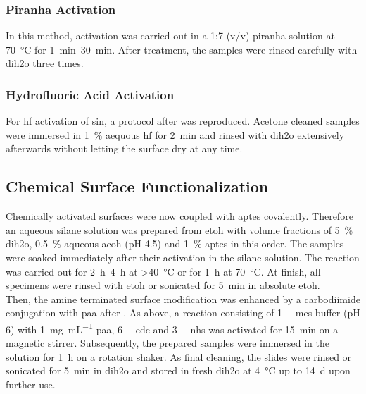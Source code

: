 \subsubsection{Piranha Activation}
In this method, activation was carried out in a 1:7 (v/v) piranha solution at \SI{70}{\degreeCelsius} for \SIrange{1}{30}{\minute}. After treatment, the samples were rinsed carefully with \gls{dih2o} three times.
\subsubsection{Hydrofluoric Acid Activation}
For \gls{hf} activation of \gls{sin}, a protocol after \citet{lit:chem:sin:surfacEtchingandMod} was reproduced. Acetone cleaned samples were immersed in \SI{1}{\percent} aequous \gls{hf} for \SI{2}{\minute} and rinsed with \gls{dih2o} extensively afterwards without letting the surface dry at any time.
\subsection{Chemical Surface Functionalization}
\label{sec:meth:surfFunc}
Chemically activated surfaces were now coupled with \gls{aptes} covalently. Therefore an aqueous silane solution was prepared from \gls{etoh} with volume fractions of \SI{5}{\percent} \gls{dih2o}, \SI{0.5}{\percent} aqueous \gls{acoh} (pH 4.5) and \SI{1}{\percent} \gls{aptes} in this order. The samples were soaked immediately after their activation in the silane solution. The reaction was carried out for \SIrange{2}{4}{\hour} at \SI{>40}{\degreeCelsius} or for \SI{1}{\hour} at \SI{70}{\degreeCelsius}. At finish, all specimens were rinsed with \gls{etoh} or sonicated for \SI{5}{\minute} in absolute \gls{etoh}.\\
Then, the amine terminated surface modification was enhanced by a carbodiimide conjugation with \gls{paa} after \citet{lit:Anti-EpCAM-PAA}. As above, a reaction consisting of \SI{1}{\milli\molar} \gls{mes} buffer (pH 6) with \SI{1}{\milli\gram\per\milli\liter} \gls{paa}, \SI{6}{\milli\molar} \gls{edc} and  \SI{3}{\milli\molar} \gls{nhs} was activated for \SI{15}{\minute} on a magnetic stirrer. Subsequently, the prepared samples were immersed in the solution for \SI{1}{\hour} on a rotation shaker. As final cleaning, the slides were rinsed or sonicated for \SI{5}{\minute} in \gls{dih2o} and stored in fresh \gls{dih2o} at \SI{4}{\degreeCelsius} up to \SI{14}{\day} upon further use.
